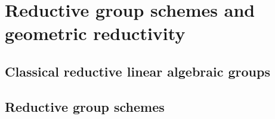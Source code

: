 \section{Reductive group schemes and geometric reductivity}
    \subsection{Classical reductive linear algebraic groups}
    
    \subsection{Reductive group schemes}